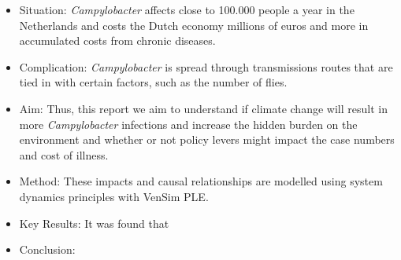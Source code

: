 
\begin{itemize}
    \item Situation: \textit{Campylobacter} affects close to 100.000 people a year in the Netherlands and costs the Dutch economy millions of euros and more in accumulated costs from chronic diseases. 
    
    \item Complication: \textit{Campylobacter} is spread through transmissions routes that are tied in with certain factors, such as the number of flies. 
    
    \item Aim: Thus, this report we aim to understand if climate change will result in more \textit{Campylobacter} infections and increase the hidden burden on the environment and whether or not policy levers might impact the case numbers and cost of illness. 
    \item Method: These impacts and causal relationships are modelled using system dynamics principles with VenSim PLE. 
    
    \item Key Results: It was found that 
    
    \item Conclusion: 
\end{itemize}

